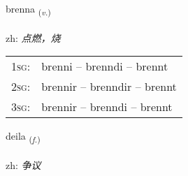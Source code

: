 \documentclass[frontgrid, backgrid]{flacards}\usepackage[]{graphicx}\usepackage[]{color}
\begin{document}
\renewcommand{\flhead}{\vskip5pt \fboxsep=0pt {\small\bfseries\footnotesize Sagnorð | 动词}}
\renewcommand{\fcfoot}{\vskip5pt \fboxsep=0pt \hspace{2pt}{\small\bfseries\footnotesize 2K}}

\renewcommand{\blhead}{\vskip5pt {\small\bfseries\footnotesize Sagnorð | 动词 }}
\renewcommand{\bcfoot}{\vskip5pt \hspace{2pt}{\small\bfseries\footnotesize 2K}}


{brenna \small{\textsubscript{(\textit{v.})}} \\[1ex] %
\textphonetic{[prɛna]} \\
zh: \emph{点燃，烧} \\  [2ex]
\renewcommand*{\arraystretch}{0.8}
\begin{tabular}{p{1cm}l}
\textsc{1sg}: & brenni -- brenndi -- brennt \\ 
\textsc{2sg}: & brennir -- brenndir -- brennt \\ 
\textsc{3sg}: & brennir -- brenndi -- brennt \\ 
\end{tabular}
}

\renewcommand{\flhead}{\vskip5pt \fboxsep=0pt {\small\bfseries\footnotesize Nafnorð | 名词}}
\renewcommand{\fcfoot}{\vskip5pt \fboxsep=0pt \hspace{2pt}{\small\bfseries\footnotesize 2K}}

\renewcommand{\blhead}{\vskip5pt {\small\bfseries\footnotesize Nafnorð | 名词 }}
\renewcommand{\bcfoot}{\vskip5pt \hspace{2pt}{\small\bfseries\footnotesize 2K}}


{deila \small{\textsubscript{(\textit{f.})}} \\[1ex] %
\textphonetic{[teiːla]} \\
zh: \emph{争议} \\  [2ex]
\renewcommand*{\arraystretch}{0.8}
}
\end{document}
